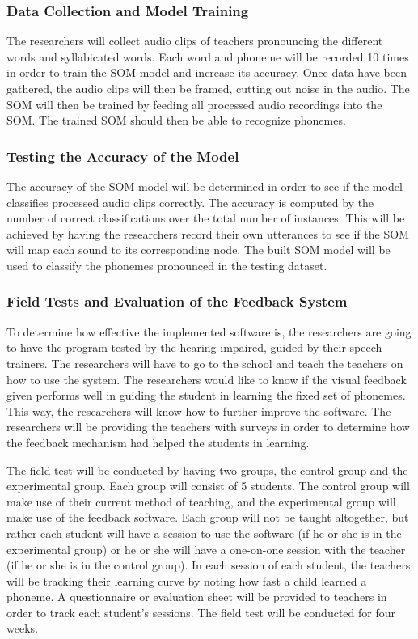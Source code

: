 \subsubsection{Data Collection and Model Training}
The researchers will collect audio clips of teachers pronouncing the different words and syllabicated words. Each word and phoneme will be recorded 10 times in order to train the SOM model and increase its accuracy. Once data have been gathered, the audio clips will then be framed, cutting out noise in the audio. The SOM will then be trained by feeding all processed audio recordings into the SOM. The trained SOM should then be able to recognize phonemes.

\subsubsection{Testing the Accuracy of the Model}
The accuracy of the SOM model will be determined in order to see if the model classifies processed audio clips correctly. The accuracy is computed by the number of correct classifications over the total number of instances. This will be achieved by having the researchers record their own utterances to see if the SOM will map each sound to its corresponding node. The built SOM model will be used to classify the phonemes pronounced in the testing dataset.

\subsubsection{Field Tests and Evaluation of the Feedback System}
To determine how effective the implemented software is, the researchers are going to have the program tested by the hearing-impaired, guided by their speech trainers. The researchers will have to go to the school and teach the teachers on how to use the system. The researchers would like to know if the visual feedback given performs well in guiding the student in learning the fixed set of phonemes. This way, the researchers will know how to further improve the software. The researchers will be providing the teachers with surveys in order to determine how the feedback mechanism had helped the students in learning.

The field test will be conducted by having two groups, the control group and the experimental group. Each group will consist of 5 students. The control group will make use of their current method of teaching, and the experimental group will make use of the feedback software. Each group will not be taught altogether, but rather each student will have a session to use the software (if he or she is in the experimental group) or he or she will have a one-on-one session with the teacher (if he or she is in the control group). In each session of each student, the teachers will be tracking their learning curve by noting how fast a child learned a phoneme. A questionnaire or evaluation sheet will be provided to teachers in order to track each student's sessions. The field test will be conducted for four weeks.

